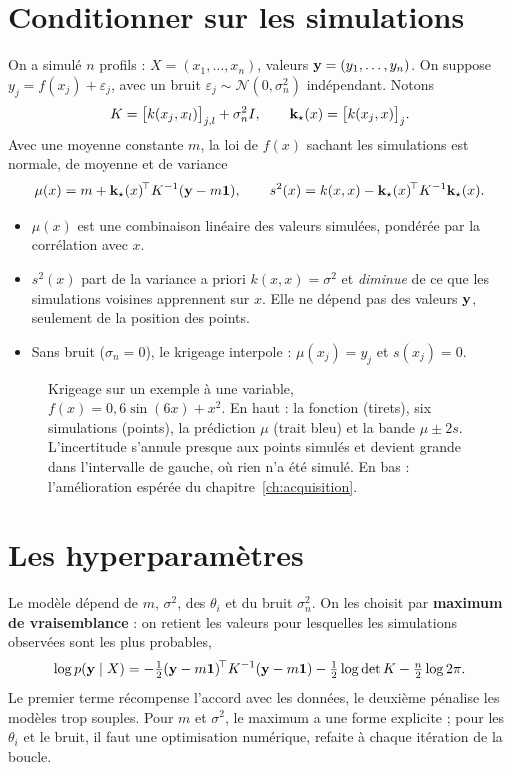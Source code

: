 \section{Conditionner sur les simulations}
On a simulé $n$ profils : $X=(x_1,\dots,x_n)$, valeurs $\mathbf{y}=(y_1,\dots,y_n)$. On suppose $y_j=f(x_j)+\varepsilon_j$, avec un bruit $\varepsilon_j\sim\mathcal N(0,\sigma_n^2)$ indépendant. Notons
\[
K=\big[k(x_j,x_l)\big]_{j,l}+\sigma_n^2 I,\qquad \mathbf{k}_\star(x)=\big[k(x_j,x)\big]_j .
\]
Avec une moyenne constante $m$, la loi de $f(x)$ sachant les simulations est normale, de moyenne et de variance
\begin{equation}\label{eq:krigeage}
\mu(x)=m+\mathbf{k}_\star(x)^{\!\top}K^{-1}(\mathbf{y}-m\mathbf{1}),\qquad
s^2(x)=k(x,x)-\mathbf{k}_\star(x)^{\!\top}K^{-1}\mathbf{k}_\star(x).
\end{equation}

\begin{resultat}
\begin{itemize}
\item $\mu(x)$ est une combinaison linéaire des valeurs simulées, pondérée par la corrélation avec $x$.
\item $s^2(x)$ part de la variance a priori $k(x,x)=\sigma^2$ et \emph{diminue} de ce que les simulations voisines apprennent sur $x$. Elle ne dépend pas des valeurs $\mathbf{y}$, seulement de la position des points.
\item Sans bruit ($\sigma_n=0$), le krigeage interpole : $\mu(x_j)=y_j$ et $s(x_j)=0$.
\end{itemize}
\end{resultat}

\begin{figure}[htbp]
\centering

\caption{Krigeage sur un exemple à une variable, $f(x)=0{,}6\sin(6x)+x^2$. En haut : la fonction (tirets), six simulations (points), la prédiction $\mu$ (trait bleu) et la bande $\mu\pm2s$. L'incertitude s'annule presque aux points simulés et devient grande dans l'intervalle de gauche, où rien n'a été simulé. En bas : l'amélioration espérée du chapitre~\ref{ch:acquisition}.}\label{fig:gp1d}
\end{figure}

\section{Les hyperparamètres}
Le modèle dépend de $m$, $\sigma^2$, des $\theta_i$ et du bruit $\sigma_n^2$. On les choisit par \textbf{maximum de vraisemblance} : on retient les valeurs pour lesquelles les simulations observées sont les plus probables,
\[
\log p(\mathbf{y}\mid X)=-\tfrac12(\mathbf{y}-m\mathbf{1})^{\!\top}K^{-1}(\mathbf{y}-m\mathbf{1})-\tfrac12\log\det K-\tfrac n2\log 2\pi .
\]
Le premier terme récompense l'accord avec les données, le deuxième pénalise les modèles trop souples. Pour $m$ et $\sigma^2$, le maximum a une forme explicite ; pour les $\theta_i$ et le bruit, il faut une optimisation numérique, refaite à chaque itération de la boucle.

